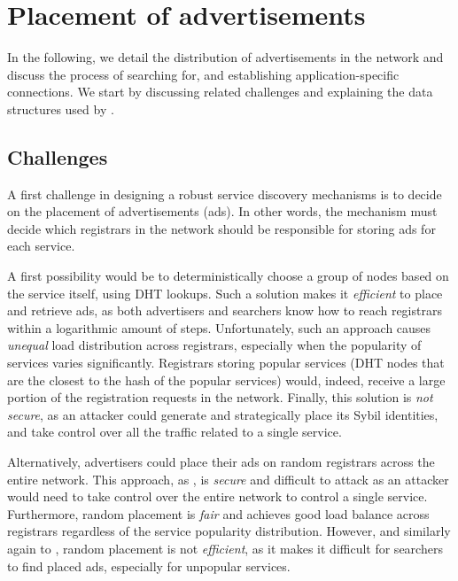 
\section{Placement of advertisements}
\label{sec:placement}

In the following, we detail the distribution of advertisements in the network and discuss the process of searching for, and establishing application-specific connections.
We start by discussing related challenges and explaining the data structures used by \sysname. 

\subsection{Challenges}


A first challenge in designing a robust service discovery mechanisms is to decide on the placement of advertisements (ads).
In other words, the mechanism must decide which registrars in the network should be responsible for storing ads for each service.

A first possibility would be to deterministically choose a group of nodes based on the service itself, using DHT lookups.
Such a solution makes it \emph{efficient} to place and retrieve ads, as both advertisers and searchers know how to reach registrars within a logarithmic amount of steps.
Unfortunately, such an approach causes \emph{unequal} load distribution across registrars, especially when the popularity of services varies significantly.
Registrars storing popular services (\ie DHT nodes that are the closest to the hash of the popular services) would, indeed, receive a large portion of the registration requests in the network. 
Finally, this solution is \emph{not secure}, as an attacker could generate and strategically place its Sybil identities, and take control over all the traffic related to a single service. 

Alternatively, advertisers could place their ads on random registrars across the entire network. 
This approach, as \discv, is \emph{secure} and difficult to attack as an attacker would need to take control over the entire network to control a single service.
Furthermore, random placement is \emph{fair} and achieves good load balance across registrars regardless of the service popularity distribution.
However, and similarly again to \discv, random placement is not \emph{efficient}, as it makes it difficult for searchers to find placed ads, especially for unpopular services. 

